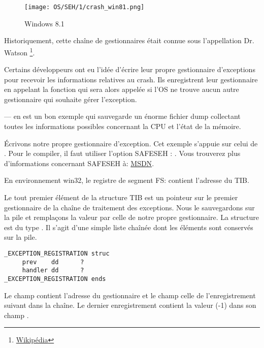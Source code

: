 \begin{figure}[H]
\centering
\texttt{[image: OS/SEH/1/crash\_win81.png]}
\caption{Windows 8.1}
\end{figure}

Historiquement, cette chaîne de gestionnaires était connue sous l'appellation Dr. Watson
\footnote{\href{http://go.yurichev.com/17046}{Wikipédia}}.

Certains développeurs ont eu l'idée d'écrire leur propre gestionnaire d'exceptions pour recevoir
les informations relatives au crash.
Ils enregistrent leur gestionnaire en appelant la fonction  qui
sera alors appelée si l'\ac{OS} ne trouve aucun autre gestionnaire qui souhaite gérer l'exception.

\myindex{\oracle}
\oracle--- en est un bon exemple qui sauvegarde un énorme fichier dump collectant toutes les
informations possibles concernant la \ac{CPU} et l'état de la mémoire.

Écrivons notre propre gestionnaire d'exception. Cet exemple s'appuie sur celui de \PietrekSEH.
Pour le compiler, il faut utiliser l'option SAFESEH : .
Vous trouverez plus d'informations concernant SAFESEH à: \href{http://go.yurichev.com/17252}{MSDN}.



En environnement win32, le registre de segment FS: contient l'adresse du \ac{TIB}.

Le tout premier élément de la structure \ac{TIB} est un pointeur sur le premier gestionnaire de la
chaîne de traitement des exceptions.
Nous le sauvegardons sur la pile et remplaçons la valeur par celle de notre propre gestionnaire.
La structure est du type . Il s'agit d'une simple liste chaînée dont
les éléments sont conservés sur la pile.

\begin{lstlisting}[caption=MSVC/VC/crt/src/exsup.inc,style=customasmx86]
_EXCEPTION_REGISTRATION struc
     prev    dd      ?
     handler dd      ?
_EXCEPTION_REGISTRATION ends
\end{lstlisting}

Le champ  contient l'adresse du gestionnaire et le champ  celle de
l'enregistrement suivant dans la chaîne.
Le dernier enregistrement contient la valeur  (-1) dans son champ .

